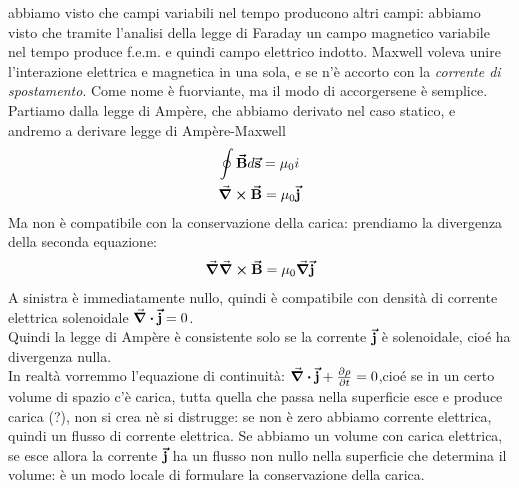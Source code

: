 abbiamo visto che campi variabili nel tempo producono altri campi: abbiamo visto che tramite l'analisi della legge di Faraday un campo magnetico variabile nel tempo produce f.e.m. e quindi campo elettrico indotto. Maxwell voleva unire l'interazione elettrica e magnetica in una sola, e se n'è accorto con la \textit{corrente di spostamento}. Come nome è fuorviante, ma il modo di accorgersene è semplice.\\
Partiamo dalla legge di Ampère, che abbiamo derivato nel caso statico, e andremo a derivare legge di Ampère-Maxwell
\begin{gather*}
	\oint\vb*{\va{B}}d\vb*{\va{s}}=\mu_0 i\\
	\curl\vb*{\va{B}}=\mu_0\vb*{\va{j}}
\end{gather*}
Ma non è compatibile con la conservazione della carica: prendiamo la divergenza della seconda equazione: 
\begin{gather*}
	\grad\curl\vb*{\va{B}}=\mu_0\grad\vb*{\va{j}}
\end{gather*}
A sinistra è immediatamente nullo, quindi è compatibile con densità di corrente elettrica solenoidale $\div\vb*{\va{j}}=0$.\\
Quindi la legge di Ampère è consistente solo se la corrente $\vb*{\va{j}}$ è solenoidale, cioé ha divergenza nulla.\\
In realtà vorremmo l'equazione di continuità: $\div\vb*{\va{j}}+\pdv{\rho}{t}=0$,cioé se in un certo volume di spazio c'è carica, tutta quella che passa nella superficie esce e produce carica (?), non si crea nè si distrugge: se non è zero abbiamo corrente elettrica, quindi un flusso di corrente elettrica. Se abbiamo un volume con carica elettrica, se esce allora la corrente $\vb*{\va{j}}$ ha un flusso non nullo nella superficie che determina il volume: è un modo locale di formulare la conservazione della carica.\\

